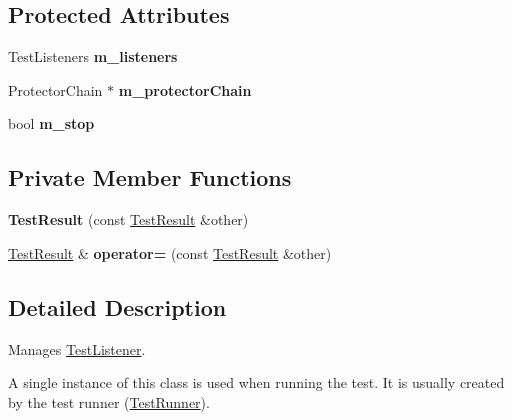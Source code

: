 \subsection*{Protected Attributes}
\begin{DoxyCompactItemize}
\item 
Test\+Listeners {\bfseries m\+\_\+listeners}\hypertarget{class_test_result_a6e5daf8393ca6cdd5a9c3b44074b037b}{}\label{class_test_result_a6e5daf8393ca6cdd5a9c3b44074b037b}

\item 
Protector\+Chain $\ast$ {\bfseries m\+\_\+protector\+Chain}\hypertarget{class_test_result_abb4a702b14af262661a9e02a0193312f}{}\label{class_test_result_abb4a702b14af262661a9e02a0193312f}

\item 
bool {\bfseries m\+\_\+stop}\hypertarget{class_test_result_ab8c04c2021b19f0c8d19bf4675f2bd86}{}\label{class_test_result_ab8c04c2021b19f0c8d19bf4675f2bd86}

\end{DoxyCompactItemize}
\subsection*{Private Member Functions}
\begin{DoxyCompactItemize}
\item 
{\bfseries Test\+Result} (const \hyperlink{class_test_result}{Test\+Result} \&other)\hypertarget{class_test_result_ab58766a8794b09d7ce96c3a55e91a418}{}\label{class_test_result_ab58766a8794b09d7ce96c3a55e91a418}

\item 
\hyperlink{class_test_result}{Test\+Result} \& {\bfseries operator=} (const \hyperlink{class_test_result}{Test\+Result} \&other)\hypertarget{class_test_result_a774a1e3d4525b1c1c8ac47fb67a44dd5}{}\label{class_test_result_a774a1e3d4525b1c1c8ac47fb67a44dd5}

\end{DoxyCompactItemize}


\subsection{Detailed Description}
Manages \hyperlink{class_test_listener}{Test\+Listener}.

A single instance of this class is used when running the test. It is usually created by the test runner (\hyperlink{class_test_runner}{Test\+Runner}). 

